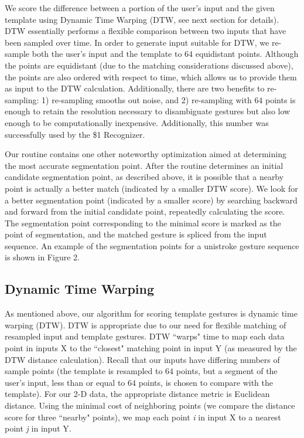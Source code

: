 \documentclass[twoside]{article}
\begin{document}
\begin{multicols}{2}
We score the difference between
a portion of the user's input and the given template using Dynamic Time Warping
(DTW, see next section for details). DTW essentially performs a flexible
comparison between two inputs that have been sampled over time. In order to generate
input suitable for DTW, we re-sample both the user's input and the template
to $64$ equidistant points. Although the points are equidistant (due to the matching
considerations discussed above), the points are also ordered with respect to time, which
allows us to provide them as input to the DTW calculation. Additionally,
there are two benefits to re-sampling: 1) re-sampling smooths out noise, and 2)
re-sampling with $64$ points is enough to retain the resolution necessary to disambiguate gestures
but also low enough to be computationally inexpensive. Additionally, this number was
successfully used by the \$1 Recognizer\cite{wobbrock2007gestures}.

Our routine contains one other noteworthy optimization aimed at
determining the most accurate segmentation point. After the routine determines
an initial candidate segmentation point, as described above, it is possible that
a nearby point is actually a better match (indicated by a smaller DTW score).
We look for a better segmentation point (indicated by a smaller score) by
searching backward and forward from the initial candidate point, repeatedly calculating
the score. The segmentation point corresponding to the minimal score is marked as the 
point of segmentation, and the matched gesture is spliced from the input sequence. An example
of the segmentation points for a unistroke gesture sequence is shown in Figure 2.

\subsection*{Dynamic Time Warping}

As mentioned above, our algorithm for scoring template gestures is dynamic time
warping (DTW). DTW is appropriate due to our need for flexible matching of
resampled input and template gestures. DTW ``warps" time to map each data point in
inputs X to the ``closest" matching point in input Y (as measured by the DTW distance
calculation). Recall that our inputs have differing numbers of sample points
(the template is resampled to $64$ points, but a segment of the user's input,
less than or equal to $64$ points, is chosen to compare with the template). For
our 2-D data, the appropriate distance metric is Euclidean distance. Using the
minimal cost of neighboring points (we compare the distance score for three ``nearby" points),
we map each point \emph{i} in input X to a nearest point \emph{j} in input Y.


\end{multicols}
\end{document}
